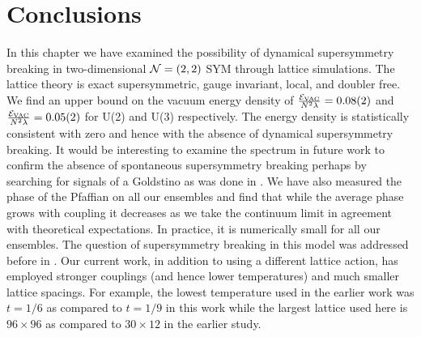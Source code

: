 \section{Conclusions}
\label{sec:conclude}

In this chapter we have examined the possibility of dynamical supersymmetry breaking in two-dimensional $\mathcal N = (2, 2)$ SYM through lattice simulations. The lattice theory is exact supersymmetric, gauge invariant, local, and doubler free.
We find an upper bound on the vacuum energy density of $\frac{\mathcal{E}_{\mathrm{VAC}}}{N^2 \lambda}=0.08(2)$ and $\frac{\mathcal{E}_{\mathrm{VAC}}}{N^2 \lambda}=0.05(2)$ for U(2) and U(3) respectively. The energy
density is statistically consistent with zero and hence with the absence of dynamical supersymmetry
breaking. It would be interesting to examine the spectrum in future work to confirm the absence of spontaneous supersymmetry
breaking perhaps by searching for signals of a Goldstino as was done in \cite{Catterall:2015tta}. We have also measured the phase of the Pfaffian on all our ensembles and find that while the average
phase grows with coupling it decreases as we take the continuum limit in agreement with theoretical expectations.
In practice, it is numerically small for all our ensembles. 
The question of supersymmetry breaking in this model was addressed before in \cite{Kanamori:2009dk}. Our current work, in addition to using a different lattice action, has employed stronger couplings (and hence
lower temperatures) and much smaller lattice spacings. For example, the lowest temperature used in the earlier work was $t = 1/6$ as compared to $t = 1/9$ in this work while the largest lattice used here is $96\times 96$ as compared
to $30\times 12$ in the earlier study.
